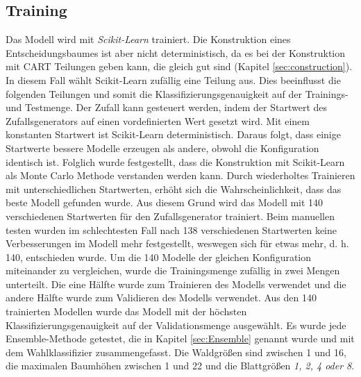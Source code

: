 \subsection{Training}
\label{sec:Training}
Das Modell wird mit \textit{Scikit-Learn} trainiert. Die Konstruktion eines Entscheidungsbaumes ist aber nicht deterministisch, da es bei der Konstruktion mit CART Teilungen geben kann, die gleich gut sind
(Kapitel \ref{sec:construction}). In diesem Fall wählt Scikit-Learn zufällig eine Teilung aus. Dies beeinflusst die folgenden Teilungen und somit die Klassifizierungsgenauigkeit auf der
Trainings- und Testmenge. Der Zufall kann gesteuert werden, indem der Startwert des Zufallsgenerators auf einen vordefinierten Wert gesetzt wird. Mit einem konstanten Startwert ist Scikit-Learn deterministisch.
\newline
\newline
Daraus folgt, dass einige Startwerte bessere Modelle erzeugen als andere, obwohl die Konfiguration identisch ist. Folglich wurde festgestellt, dass die Konstruktion mit Scikit-Learn als Monte Carlo Methode verstanden
werden kann. Durch wiederholtes Trainieren mit unterschiedlichen Startwerten, erhöht sich die Wahrscheinlichkeit, dass das beste Modell gefunden wurde. Aus diesem Grund wird das
Modell mit 140 verschiedenen Startwerten für den Zufallsgenerator trainiert. Beim manuellen testen wurden im schlechtesten Fall nach 138 verschiedenen Startwerten keine Verbesserungen im Modell mehr festgestellt,
weswegen sich für etwas mehr, d. h. 140, entschieden wurde.
\newline
\newline
Um die 140 Modelle der gleichen Konfiguration miteinander zu vergleichen, wurde die Trainingsmenge zufällig in zwei Mengen unterteilt. Die eine Hälfte wurde zum Trainieren des Modells verwendet und die andere
Hälfte wurde zum Validieren des Modells verwendet. Aus den 140 trainierten Modellen wurde das Modell mit der höchsten Klassifizierungsgenauigkeit auf der Validationsmenge ausgewählt.
\newline
\newline
Es wurde jede Ensemble-Methode getestet, die in Kapitel \ref{sec:Ensemble} genannt wurde und mit dem Wahlklassifizier zusammengefasst. Die Waldgrößen sind zwischen 1 und 16, die maximalen Baumhöhen zwischen
1 und 22 und die Blattgrößen \textit{1, 2, 4 oder 8}.


